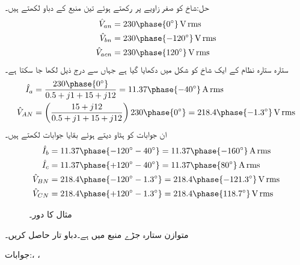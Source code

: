 حل:شاخ  کو صفر زاویے پر رکھتے ہوئے  تین منبع کے دباو لکھتے ہیں۔
\begin{align*}
\hat{V}_{an}&=230\phase{0^{\circ}}\,\si{\volt}\,\rms\\
\hat{V}_{bn}&=230\phase{-120^{\circ}}\,\si{\volt}\,\rms\\
\hat{V}_{acn}&=230\phase{120^{\circ}}\,\si{\volt}\,\rms
\end{align*}
ستارہ ستارہ نظام کے ایک شاخ کو شکل  میں دکھایا گیا ہے جہاں سے درج ذیل لکھا جا سکتا ہے۔
\begin{align*}
\hat{I}_a&=\frac{230\phase{0^{\circ}}}{0.5+j1+15+j12}=11.37\phase{-40^{\circ}}\,\si{\ampere}\,\rms\\
\hat{V}_{AN}&=\left(\frac{15+j12}{0.5+j1+15+j12}\right) 230\phase{0^{\circ}}=218.4\phase{-1.3^{\circ}}\,\si{\volt}\,\rms
\end{align*}
ان جوابات کو  ہٹاو دیتے ہوئے بقایا جوابات لکھتے ہیں۔
\begin{align*}
\hat{I}_b&=11.37\phase{-120^{\circ}-40^{\circ}}=11.37\phase{-160^{\circ}}\,\si{\ampere}\,\rms\\
\hat{I}_c&=11.37\phase{+120^{\circ}-40^{\circ}}=11.37\phase{80^{\circ}}\,\si{\ampere}\,\rms\\
\hat{V}_{BN}&=218.4\phase{-120^{\circ}-1.3^{\circ}}=218.4\phase{-121.3^{\circ}}\,\si{\volt}\,\rms\\
\hat{V}_{CN}&=218.4\phase{+120^{\circ}-1.3^{\circ}}=218.4\phase{118.7^{\circ}}\,\si{\volt}\,\rms
\end{align*} 
%
\begin{figure}
\centering
{}
\caption{مثال  کا دور۔}
\label{شکل_تین_دوری_ستارہ_ستارہ_بوجھ_رکاوٹ_الف}
\end{figure}
متوازن  ستارہ جڑے منبع میں  ہے۔دباو تار حاصل کریں۔

جوابات:، ، 

